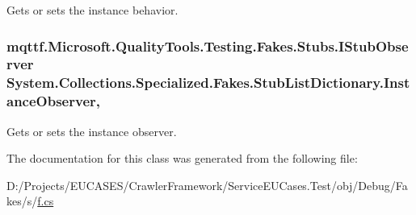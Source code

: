 Gets or sets the instance behavior.

\hypertarget{class_system_1_1_collections_1_1_specialized_1_1_fakes_1_1_stub_list_dictionary_a94cc45768161d503b50b1fa1e02195ea}{
\subsubsection[{Instance\-Observer}]{\setlength{\rightskip}{0pt plus 5cm}mqttf.\-Microsoft.\-Quality\-Tools.\-Testing.\-Fakes.\-Stubs.\-I\-Stub\-Observer System.\-Collections.\-Specialized.\-Fakes.\-Stub\-List\-Dictionary.\-Instance\-Observer\hspace{0.3cm}{\ttfamily [get]}, {\ttfamily [set]}}}\label{class_system_1_1_collections_1_1_specialized_1_1_fakes_1_1_stub_list_dictionary_a94cc45768161d503b50b1fa1e02195ea}


Gets or sets the instance observer.



The documentation for this class was generated from the following file\-:\begin{DoxyCompactItemize}
\item 
D\-:/\-Projects/\-E\-U\-C\-A\-S\-E\-S/\-Crawler\-Framework/\-Service\-E\-U\-Cases.\-Test/obj/\-Debug/\-Fakes/s/\hyperlink{s_2f_8cs}{f.\-cs}\end{DoxyCompactItemize}
